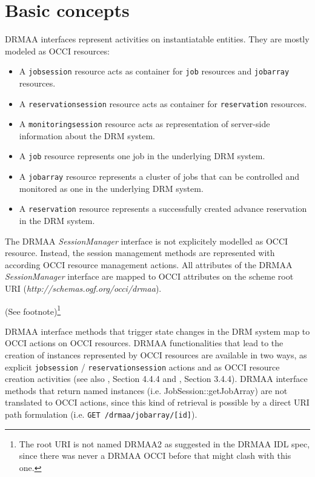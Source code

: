\documentclass[10pt]{article}
\newcommand{\h}[1]{\lstinline|#1|}
\newcommand{\rat}[1]{ {\tiny(See footnote)}\footnote{#1} }
\begin{document}
\section{Basic concepts}

DRMAA interfaces represent activities on instantiatable entities. They are mostly modeled as OCCI resources:

\begin{itemize}
\item A \h{jobsession} resource acts as container for \h{job} resources and \h{jobarray} resources. 
\item A \h{reservationsession} resource acts as container for \h{reservation} resources. 
\item A \h{monitoringsession} resource acts as representation of server-side information about the DRM system. 
\item A \h{job} resource represents one job in the underlying DRM system.
\item A \h{jobarray} resource represents a cluster of jobs that can be controlled and monitored as one in the underlying DRM system.
\item A \h{reservation} resource represents a successfully created advance reservation in the DRM system.
\end{itemize}



The DRMAA \emph{SessionManager} interface is not explicitely modelled as OCCI resource. Instead, the session management methods are represented with according OCCI resource management actions. All attributes of the DRMAA \emph{SessionManager} interface are mapped to OCCI attributes on the scheme root URI (\emph{http://schemas.ogf.org/occi/drmaa}). 


\rat{The root URI is not named DRMAA2 as suggested in the DRMAA IDL spec, since there was never a DRMAA OCCI before that might clash with this one.}

DRMAA interface methods that trigger state changes in the DRM system map to OCCI actions on OCCI resources. DRMAA functionalities that lead to the creation of instances represented by OCCI resources are available in two ways, as explicit \h{jobsession} / \h{reservationsession} actions and as OCCI resource creation activities (see also \cite{gfd183}, Section 4.4.4 and \cite{gfd185}, Section 3.4.4). DRMAA interface methods that return named instances (i.e. JobSession::getJobArray) are not translated to OCCI actions, since this kind of retrieval is possible by a direct URI path formulation (i.e. \h{GET /drmaa/jobarray/[id]}).
\end{document}
